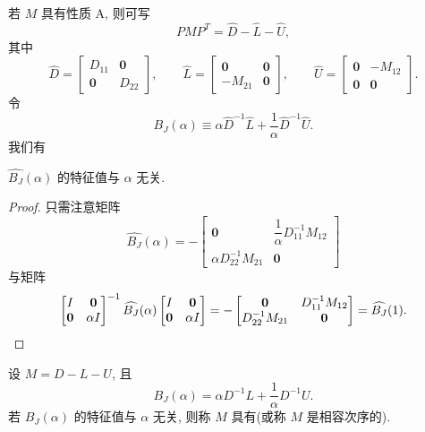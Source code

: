 若 $M$ 具有性质 A, 则可写
\[
  PMP^T=\widehat{D}-\widehat{L}-\widehat{U},
\]
其中
\[
  \widehat{D}=
  \begin{bmatrix}
    D_{11} & \mathbf{0}\\
    \mathbf{0} & D_{22}
  \end{bmatrix},
  \qquad
  \widehat{L}=
  \begin{bmatrix}
    \mathbf{0} & \mathbf{0}\\
    -M_{21} & \mathbf{0}
  \end{bmatrix},
  \qquad
  \widehat{U}=
  \begin{bmatrix}
    \mathbf{0} & -M_{12}\\
    \mathbf{0} & \mathbf{0}
  \end{bmatrix}.
\]
令
\[
  \widehat{B_J}(\alpha)\equiv\alpha\widehat{D}^{-1}\widehat{L}
  +\frac{1}{\alpha}\widehat{D}^{-1}\widehat{U}.
\]
我们有

\begin{theorem}
\label{thm:5-11}
$\widehat{B_J}(\alpha)$ 的特征值与 $\alpha$ 无关.
\end{theorem}

\begin{proof}
只需注意矩阵
\[
  \widehat{B_J}(\alpha)=-
  \begin{bmatrix}
    \mathbf{0} & \dfrac{1}{\alpha}D_{11}^{-1}M_{12}\\[8pt]
    \alpha D_{22}^{-1}M_{21} & \mathbf{0}
  \end{bmatrix}
\]
与矩阵
\[
  \begin{bmatrix}
    I & \mathbf{0}\\
    \mathbf{0} & \alpha I
  \end{bmatrix}^{-1}
  \widehat{B_J}(\alpha)
  \begin{bmatrix}
    I & \mathbf{0}\\
    \mathbf{0} & \alpha I
  \end{bmatrix}
  =-
  \begin{bmatrix}
    \mathbf{0} & D_{11}^{-1}M_{12}\\
    D_{22}^{-1}M_{21} & \mathbf{0}
  \end{bmatrix}
  =\widehat{B_J}(1).\qedhere
\]
\end{proof}

\begin{definition}
\label{def:5-5}
设 $M=D-L-U$, 且
\[
  B_J(\alpha)=\alpha D^{-1}L+\frac{1}{\alpha}D^{-1}U.
\]
若 $B_J(\alpha)$ 的特征值与 $\alpha$ 无关, 则称 $M$ 具有(或称 $M$ 是相容次序的).
\end{definition}

